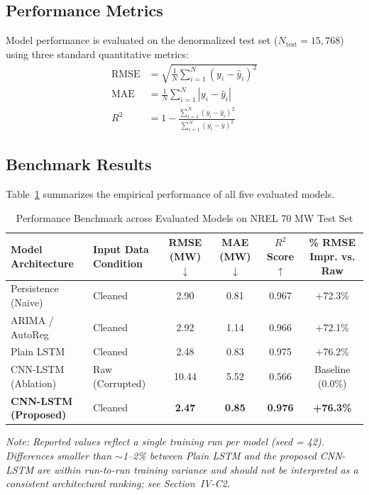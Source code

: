 \documentclass[conference]{IEEEtran}
\begin{document}
\subsection{Performance Metrics}
Model performance is evaluated on the denormalized test set ($N_{\text{test}} = 15{,}768$) using three standard quantitative metrics:
\begin{align*}
\text{RMSE} &= \sqrt{\frac{1}{N}\sum_{i=1}^N (y_i - \hat{y}_i)^2} \\
\text{MAE} &= \frac{1}{N}\sum_{i=1}^N |y_i - \hat{y}_i| \\
R^2 &= 1 - \frac{\sum_{i=1}^N (y_i - \hat{y}_i)^2}{\sum_{i=1}^N (y_i - \bar{y})^2}
\end{align*}

\subsection{Benchmark Results}
Table~\ref{tab:results} summarizes the empirical performance of all five evaluated models.

\begin{table}[t]
\centering
\caption{Performance Benchmark across Evaluated Models on NREL 70 MW Test Set}
\label{tab:results}
\begin{tabular}{@{}llcccc@{}}
\toprule
\textbf{Model Architecture} & \textbf{Input Data Condition} & \textbf{RMSE (MW) $\downarrow$} & \textbf{MAE (MW) $\downarrow$} & \textbf{$R^2$ Score $\uparrow$} & \textbf{\% RMSE Impr. vs. Raw} \\
\midrule
Persistence (Naive)          & Cleaned          & 2.90  & 0.81 & 0.967 & +72.3\% \\
ARIMA / AutoReg               & Cleaned          & 2.92  & 1.14 & 0.966 & +72.1\% \\
Plain LSTM                    & Cleaned          & 2.48  & 0.83 & 0.975 & +76.2\% \\
CNN-LSTM (Ablation)            & Raw (Corrupted)  & 10.44 & 5.52 & 0.566 & Baseline (0.0\%) \\
\textbf{CNN-LSTM (Proposed)}   & Cleaned          & \textbf{2.47} & \textbf{0.85} & \textbf{0.976} & \textbf{+76.3\%} \\
\bottomrule
\end{tabular}

\vspace{4pt}
\footnotesize{\textit{Note: Reported values reflect a single training run per model (seed = 42). Differences smaller than $\sim$1--2\% between Plain LSTM and the proposed CNN-LSTM are within run-to-run training variance and should not be interpreted as a consistent architectural ranking; see Section~IV-C2.}}
\end{table}
\end{document}
